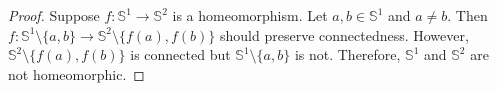 \documentclass[11pt,a4paper]{amsart}
\def\R{{\mathbb R}}
\def\S{{\mathbb S}}
\begin{document}

\begin{proof}
Suppose $f: \S^1 \to \S^2$ is a homeomorphism. Let $a,b \in\S^1$ and $a\neq b$.
Then $ f: \S^1 \setminus \{a,b\} \to \S^2 \setminus \{f(a), f(b)\} $
should preserve connectedness. 
However, $\S^2 \setminus \{f(a), f(b)\}$ is connected but $\S^1 \setminus \{a,b\}$ is not.
Therefore, $\S^1$ and $\S^2$ are not homeomorphic.
\end{proof}
\medskip


\end{document}
